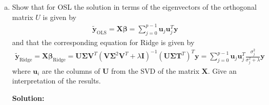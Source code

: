\documentclass{article}
\begin{document}
\begin{enumerate}[a)]
		\item Show that for OSL the solution in terms of the eigenvectors of the orthogonal matrix $U$ is given by
		\begin{align*}
			\tilde{\bm{y}}_\text{OLS}=\bm{X}\bm{\beta}=\sum_{j=0}^{p-1}\bm{u}_j\bm{u}_j^T\bm{y}
		\end{align*}
		and that the corresponding equation for Ridge is given by
		\begin{align*}
			\tilde{\bm{y}}_\text{Ridge}=\bm{X}\bm{\beta}_\text{Ridge}=\bm{U\Sigma V}^T(\bm{V\Sigma}^2\bm{V}^T+\lambda\bm{I})^{-1}(\bm{U\Sigma T}^T)^T\bm{y}=\sum_{j=0}^{p-1}\bm{u}_j\bm{u}_j^T\frac{\sigma_j^2}{\sigma_j^2+\lambda}\bm{y}
		\end{align*}
		where $\bm{u}_i$ are the columns of $\bm{U}$ from the SVD of the matrix $\bm{X}$. Give an interpretation of the results.
		
		\textbf{Solution:}
		

\end{enumerate}
\end{document}
